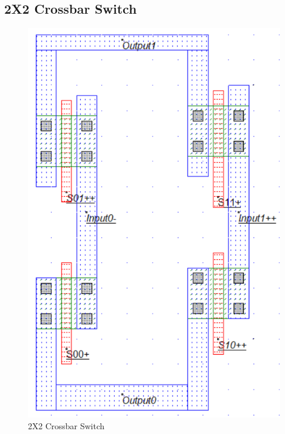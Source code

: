 \documentclass[a4paper,12pt]{article}
\begin{document}
	\subsection{2X2 Crossbar Switch}
		\begin{figure}[H]
		\centering
		\includegraphics[width=0.9\linewidth]{Images/2c}
		\caption{2X2 Crossbar Switch}
		\label{fig:2b}
	\end{figure}
\end{document}
